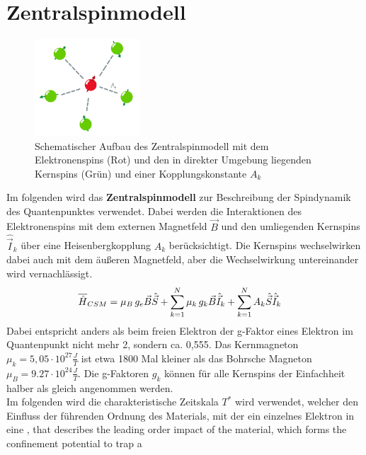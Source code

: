\chapter{Zentralspinmodell}

\begin{figure}
    \centering
    \includegraphics[width = 0.35\textwidth]{Abbildungen/CSM_Schema_Salem.png}
    \caption{Schematischer Aufbau des Zentralspinmodell mit dem Elektronenspins (Rot) und den in direkter Umgebung liegenden 
    Kernspins (Grün) und einer Kopplungskonstante $A_k$}
    \label{fig:CSM}
\end{figure}
Im folgenden wird das \textbf{Zentralspinmodell} zur Beschreibung der Spindynamik des Quantenpunktes verwendet. Dabei werden die Interaktionen des 
Elektronenspins mit dem externen Magnetfeld $\vec{B}$ und den umliegenden Kernspins $\hat{\vec{I}}_k$ über eine Heisenbergkopplung $A_k$ berücksichtigt.
Die Kernspins wechselwirken dabei auch mit dem äußeren Magnetfeld, aber die Wechselwirkung untereinander wird vernachlässigt.
\begin{align}
    \overline{\hat{H}}_{CSM} &= \mu_B\thinspace g_e \vec{B}\hat{\vec{S}} +  \sum_{k=1}^{N}\mu_k\thinspace g_k\vec{B}\hat{\vec{I}}_k + \sum_{k=1}^{N} A_k \hat{\vec{S}}\hat{\vec{I}}_k
\end{align}
Dabei entspricht anders als beim freien Elektron der g-Faktor eines Elektron im Quantenpunkt nicht mehr 2, sondern ca. 0,555. \cite{PMID:17901328}
Das Kernmagneton $\mu_k= 5,05 \cdot 10^{27} \frac{J}{T}$ ist etwa 1800 Mal kleiner als das Bohrsche 
Magneton $\mu_B = 9.27 \cdot 10^{24} \frac{J}{T}$\cite{Dyakonov2008-ub}. Die g-Faktoren $g_k$ können für alle Kernspins der 
Einfachheit halber als gleich angenommen werden. \\
Im folgenden wird die charakteristische Zeitskala $T^*$ wird verwendet, welcher den Einfluss der führenden Ordnung des Materials,
mit der ein einzelnes Elektron in eine 
, that describes the
leading order impact of the material, which forms the confinement potential to trap a
